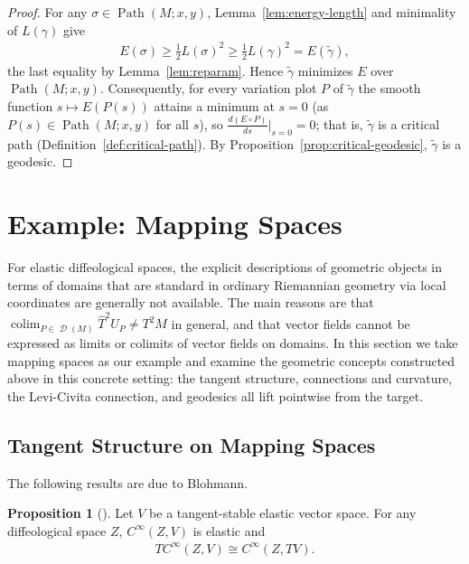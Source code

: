 \documentclass{amsart}
\DeclareMathOperator{\D}{\mathcal{D}}
\DeclareMathOperator{\Path}{Path}
\DeclareMathOperator{\colim}{colim}
\theoremstyle{definition}
\newtheorem{prop}[thm]{Proposition}
\begin{document}
\begin{proof}
  For any $\sigma \in \Path(M; x, y)$, Lemma~\ref{lem:energy-length} and
  minimality of $L(\gamma)$ give
  \begin{align*}
    E(\sigma) \ge \tfrac12 L(\sigma)^2 \ge \tfrac12 L(\gamma)^2
      = E(\widetilde\gamma),
  \end{align*}
  the last equality by Lemma~\ref{lem:reparam}. Hence $\widetilde\gamma$
  minimizes $E$ over $\Path(M; x, y)$. Consequently, for every variation plot
  $P$ of $\widetilde\gamma$ the smooth function $s \mapsto E(P(s))$ attains a
  minimum at $s = 0$ (as $P(s) \in \Path(M; x, y)$ for all $s$), so
  $\frac{d(E \circ P)}{ds}\big|_{s=0} = 0$; that is, $\widetilde\gamma$ is a
  critical path (Definition~\ref{def:critical-path}). By
  Proposition~\ref{prop:critical-geodesic}, $\widetilde\gamma$ is a geodesic.
\end{proof}

\section{Example: Mapping Spaces}\label{sec:mapping-space}

For elastic diffeological spaces, the explicit descriptions of geometric objects
in terms of domains that are standard in ordinary Riemannian geometry via local
coordinates are generally not available. The main reasons are that
$\colim_{P \in \D(M)}\hat{T}^2U_P \neq T^2M$ in general, and that vector fields
cannot be expressed as limits or colimits of vector fields on domains.
In this section we take mapping spaces as our example and examine the geometric
concepts constructed above in this concrete setting: the tangent structure,
connections and curvature, the Levi-Civita connection, and geodesics all lift
pointwise from the target.

\subsection{Tangent Structure on Mapping Spaces}\label{subsec:mapping-tangent}

The following results are due to Blohmann.

\begin{prop}[{\cite[Proposition~5.8]{B23}}]\label{prop:mapping-space-tangent-stable}
  Let $V$ be a tangent-stable elastic vector space.
  For any diffeological space $Z$, $C^\infty(Z, V)$ is elastic and
  \begin{align*}
    TC^\infty(Z, V) \cong C^\infty(Z, TV).
  \end{align*}
\end{prop}
\end{document}
